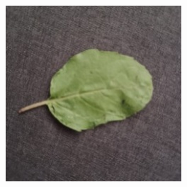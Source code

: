 \documentclass[twocolumn]{article}
\begin{document}
\begin{figure}[H]
\begin{subfigure}[b]{0.30\columnwidth}
    \end{subfigure}
    \hfill
    \begin{subfigure}[b]{0.30\columnwidth}
        \includegraphics[width=\textwidth]{tulsi3}
    \end{subfigure}
    \vspace{0.5em}
    

\end{figure}
\end{document}
